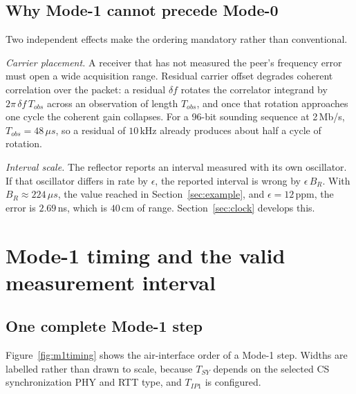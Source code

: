 \documentclass[11pt,a4paper]{article}
\newcommand{\us}{\,\ensuremath{\upmu}s}
\newcommand{\Tsy}{T_{SY}}
\newcommand{\Tip}{T_{IP1}}
\providecommand{\upmu}{\mu}
\begin{document}
\subsection{Why Mode-1 cannot precede Mode-0}

Two independent effects make the ordering mandatory rather than conventional.

\emph{Carrier placement.} A receiver that has not measured the peer's frequency error must open a
wide acquisition range. Residual carrier offset degrades coherent correlation over the packet: a
residual $\delta f$ rotates the correlator integrand by $2\pi\,\delta f\,T_{obs}$ across an
observation of length $T_{obs}$, and once that rotation approaches one cycle the coherent gain
collapses. For a 96-bit sounding sequence at 2\,Mb/s, $T_{obs}=48\us$, so a residual of
$10\,\text{kHz}$ already produces about half a cycle of rotation.

\emph{Interval scale.} The reflector reports an interval measured with its own oscillator. If that
oscillator differs in rate by $\epsilon$, the reported interval is wrong by $\epsilon\,B_R$. With
$B_R \approx 224\us$, the value reached in Section~\ref{sec:example}, and $\epsilon = 12$\,ppm, the
error is $2.69$\,ns, which is $40$\,cm of range. Section~\ref{sec:clock} develops this.

\section{Mode-1 timing and the valid measurement interval}

\subsection{One complete Mode-1 step}

Figure~\ref{fig:m1timing} shows the air-interface order of a Mode-1 step. Widths are labelled
rather than drawn to scale, because $\Tsy$ depends on the selected CS synchronization PHY and RTT
type, and $\Tip$ is configured.
\end{document}
